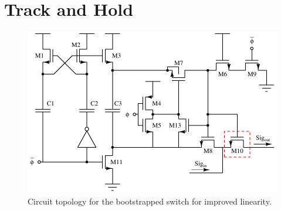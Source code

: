 \documentclass[10pt,journal]{IEEEtran}\usepackage{longtable}
\begin{document}
\section{Track and Hold}
\begin{figure}[tbph]
\begin{center}
\includegraphics[width=1\columnwidth]{BootstrappedSwitch.pdf}
\caption{Circuit topology for the bootstrapped switch for improved linearity.}
\label{fig:BootstrappedSwitch}
\end{center}
\end{figure}
\lipsum[1-4]




\end{document}
